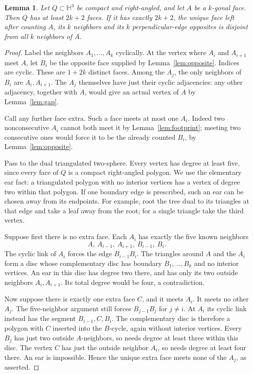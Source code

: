 \documentclass[11pt]{article}
\newtheorem{lemma}[theorem]{Lemma}
\theoremstyle{remark}
\newcommand{\HH}{\mathbb H}
\begin{document}
\begin{lemma}\label{lem:polygon}
Let $Q\subset\HH^3$ be compact and right-angled, and let $A$ be a
$k$-gonal face. Then $Q$ has at least $2k+2$ faces. If it has exactly
$2k+2$, the unique face left after counting $A$, its $k$ neighbors and
its $k$ perpendicular-edge opposites is disjoint from all $k$ neighbors
of $A$.
\end{lemma}

\begin{proof}
Label the neighbors $A_1,\ldots,A_k$ cyclically. At the vertex where
$A_i$ and $A_{i+1}$ meet $A$, let $B_i$ be the opposite face supplied by
Lemma~\ref{lem:opposite}. Indices are cyclic. These are $1+2k$ distinct
faces. Among the $A_j$, the only neighbors of $B_i$ are $A_i,A_{i+1}$.
The $A_j$ themselves have just their cyclic adjacencies: any other
adjacency, together with $A$, would give an actual vertex of $A$ by
Lemma~\ref{lem:gap}.

Call any further face extra. Such a face meets at most one $A_i$.
Indeed two nonconsecutive $A_i$ cannot both meet it by
Lemma~\ref{lem:footprint}; meeting two consecutive ones would force it
to be the already counted $B_i$, by Lemma~\ref{lem:opposite}.

Pass to the dual triangulated two-sphere. Every vertex has degree at
least five, since every face of $Q$ is a compact right-angled polygon.
We use the elementary ear fact: a triangulated polygon with no interior
vertices has a vertex of degree two within that polygon. If one boundary
edge is prescribed, such an ear can be chosen away from its endpoints.
For example, root the tree dual to its triangles at that edge and take
a leaf away from the root; for a single triangle take the third vertex.

Suppose first there is no extra face. Each $A_i$ has exactly the five
known neighbors
\[
 A,\ A_{i-1},\ A_{i+1},\ B_{i-1},\ B_i.
\]
The cyclic link of $A_i$ forces the edge $B_{i-1}B_i$. The triangles
around $A$ and the $A_i$ form a disc whose complementary disc has boundary
$B_1,\ldots,B_k$ and no interior vertices. An ear in this disc has
degree two there, and has only its two outside neighbors $A_i,A_{i+1}$.
Its total degree would be four, a contradiction.

Now suppose there is exactly one extra face $C$, and it meets $A_i$.
It meets no other $A_j$. The five-neighbor argument still forces
$B_{j-1}B_j$ for $j\ne i$. At $A_i$ its cyclic link instead has the
segment $B_{i-1},C,B_i$. The complementary disc is therefore a polygon
with $C$ inserted into the $B$-cycle, again without interior vertices.
Every $B_j$ has just two outside $A$-neighbors, so needs degree at least
three within this disc. The vertex $C$ has just the outside neighbor
$A_i$, so needs degree at least four there. An ear is impossible. Hence
the unique extra face meets none of the $A_j$, as asserted.
\end{proof}
\end{document}
